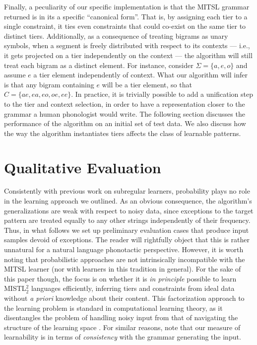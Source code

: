 \documentclass[11pt,a4paper]{article}
\begin{document}
Finally, a peculiarity of our specific implementation is that the MITSL grammar returned is in its a specific ``canonical form''.
That is, by assigning each tier to a single constraint,  it ties even  constraints that could co-exist on the same tier to distinct tiers.
Additionally, as a consequence of treating bigrams as unary symbols,  when a segment is freely distributed with respect to its contexts --- i.e., it gets projected on a tier independently on the context --- the algorithm will still treat each bigram as a distinct element.
For instance, consider $\Sigma =\{ a, e, o \}$ and assume  $e$ a tier element independently of context.
What our algorithm will infer is that any bigram containing $e$ will be a tier element, so that $C = \{ ae, ea, eo, oe, ee\}$.\@
In practice, it is trivially possible to add a unification step to the tier and context selection, in order to have a representation closer to the grammar a human phonologist would write.
The following section discusses the performance of the algorithm on an initial set of test data.
We also discuss how the way the algorithm instantiates tiers affects the class of learnable patterns.


\section{Qualitative Evaluation}

Consistently with previous work on subregular learners,  probability plays no role in the learning approach we outlined.
As an obvious consequence, the algorithm's generalizations are weak with respect to noisy data, since exceptions to the target pattern are treated equally to any other strings independently of their frequency.
Thus, in what follows we set up preliminary evaluation cases that produce input samples devoid of exceptions.
The reader will rightfully object that this is rather unnatural for a natural language phonotactic perspective.
However, it is worth noting that probabilistic approaches are not intrinsically incompatible with the MITSL learner (nor with learners in this tradition in general).
For the sake of this paper though, the focus is on whether it is  \emph{in principle} possible to learn MISTL$^2_2$ languages efficiently, inferring  tiers and constraints from ideal data without \emph{a priori} knowledge about their content.
This  factorization approach to the learning problem is standard in computational learning theory, as it disentangles the problem of handling noisy input from that of navigating the structure of the learning space \cite[a.o.]{OncinaGarcia91,jardine2016learning,JardineHeinz16}.
For similar reasons, note that our measure of learnability is in terms of \emph{consistency} with the grammar generating the input.
\end{document}
